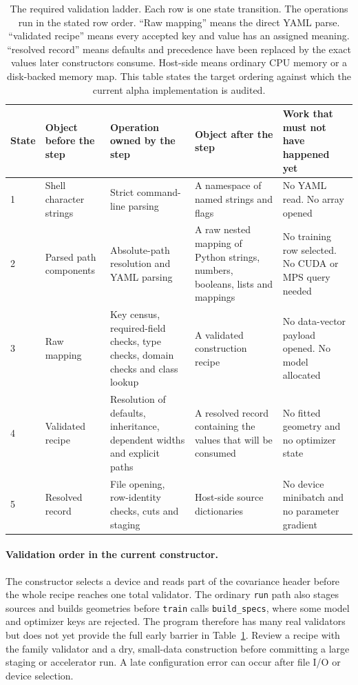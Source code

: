 \documentclass[10pt,aps,prd,twocolumn,nofootinbib]{revtex4-2}
\newcommand{\code}[1]{\texttt{#1}}
\begin{document}
\begin{table}[t]
\centering
\begin{tabular}{p{}p{}p{}p{}p{}}
\toprule
State & Object before the step & Operation owned by the step & Object after
the step & Work that must not have happened yet \\
\midrule
1 & Shell character strings & Strict command-line parsing & A namespace of
named strings and flags & No YAML read.  No array opened \\
2 & Parsed path components & Absolute-path resolution and YAML parsing & A raw
nested mapping of Python strings, numbers, booleans, lists and mappings & No
training row selected.  No CUDA or MPS query needed \\
3 & Raw mapping & Key census, required-field checks, type checks, domain
checks and class lookup & A validated construction recipe & No data-vector
payload opened.  No model allocated \\
4 & Validated recipe & Resolution of defaults, inheritance, dependent widths
and explicit paths & A resolved record containing the values that will be
consumed & No fitted geometry and no optimizer state \\
5 & Resolved record & File opening, row-identity checks, cuts and staging &
Host-side source dictionaries & No device minibatch and no parameter gradient
\\
\bottomrule
\end{tabular}
\caption{The required validation ladder.  Each row is one state transition.
The operations run in the stated row order.  ``Raw mapping'' means the
direct YAML parse. ``validated recipe'' means every accepted key and value has
an assigned meaning. ``resolved record'' means defaults and precedence have
been replaced by the exact values later constructors consume.  Host-side
means ordinary CPU memory or a disk-backed memory map.  This table states the
target ordering against which the current alpha implementation is audited.}
\label{tab:validation-ladder}
\end{table}

\paragraph{Validation order in the current constructor.}
The constructor selects a device and reads part of the covariance header before
the whole recipe reaches one total validator.  The ordinary \code{run} path
also stages sources and builds geometries before \code{train} calls
\code{build\_specs}, where some model and optimizer keys are rejected.  The
program therefore has many real validators but does not yet provide the full
early barrier in Table~\ref{tab:validation-ladder}.  Review a recipe with the
family validator and a dry, small-data construction before committing a large
staging or accelerator run.  A late configuration error can occur after file
I/O or device selection.
\end{document}
